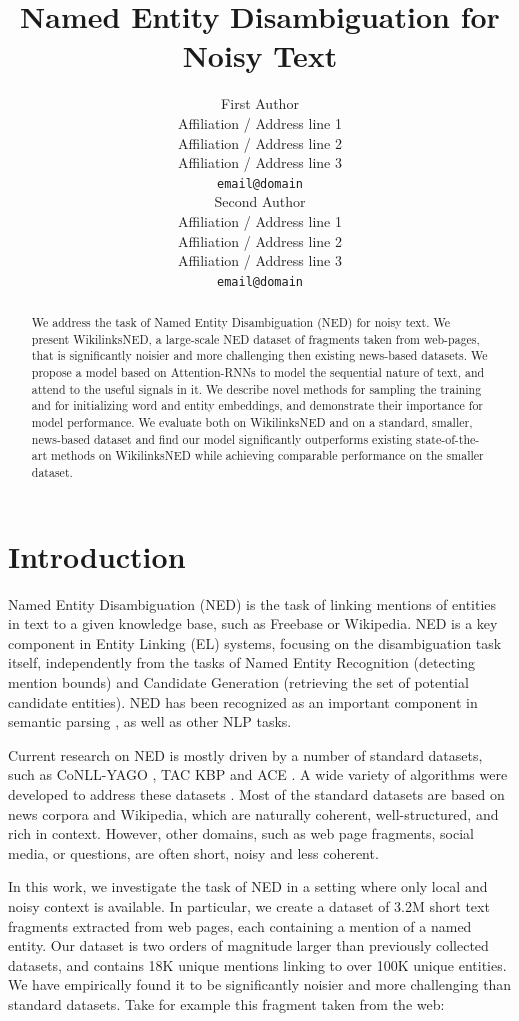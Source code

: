 \documentclass[11pt]{article}
\title{Named Entity Disambiguation for Noisy Text}
\author{First Author \\
	Affiliation / Address line 1 \\
	Affiliation / Address line 2 \\
	Affiliation / Address line 3 \\
	{\tt email@domain} \\\And
	Second Author \\
	Affiliation / Address line 1 \\
	Affiliation / Address line 2 \\
	Affiliation / Address line 3 \\
	{\tt email@domain} \\}
\date{}
\begin{document}
	\maketitle
	\begin{abstract}
		We address the task of Named Entity Disambiguation (NED) for noisy text. 
		We present WikilinksNED, a large-scale NED dataset of fragments taken from web-pages, that is significantly noisier and more challenging then existing news-based datasets.
		We propose a model based on Attention-RNNs to model the sequential nature of text, and attend to the useful signals in it.
		We describe novel methods for sampling the training and for initializing word and entity embeddings, and demonstrate their importance for model performance.
		We evaluate both on WikilinksNED and on a standard, smaller, news-based dataset and find our model significantly outperforms existing state-of-the-art methods on WikilinksNED while achieving comparable performance on the smaller dataset. 
	\end{abstract}
	
	
	
	\section{Introduction}
			
	Named Entity Disambiguation (NED) is the task of linking mentions of entities in text to a given knowledge base, such as Freebase or Wikipedia. 
	NED is a key component in Entity Linking (EL) systems, focusing on the disambiguation task itself, independently from the tasks of Named Entity Recognition (detecting mention bounds) and Candidate Generation (retrieving the set of potential candidate entities). NED has been recognized as an important component in semantic parsing \cite{berant2013semantic}, as well as other NLP tasks.
		
	Current research on NED is mostly driven by a number of standard datasets, such as CoNLL-YAGO \cite{hoffart2011robust}, TAC KBP \cite{ji2010overview} and ACE \cite{bentivogli2010extending}. A wide variety of algorithms were developed to address these datasets \cite{Shen2015Entity}. Most of the standard datasets are based on news corpora and Wikipedia, which are naturally coherent, well-structured, and rich in context. However, other domains, such as web page fragments, social media, or questions, are often short, noisy and less coherent.

	In this work, we investigate the task of NED in a setting where only local and noisy context is available. In particular, we create a dataset of 3.2M short text fragments extracted from web pages, each containing a mention of a named entity. Our dataset is two orders of magnitude larger than previously collected datasets, and contains 18K unique mentions linking to over 100K unique entities. We have empirically found it to be significantly noisier and more challenging than standard datasets. Take for example this fragment taken from the web:
	
\end{document}
